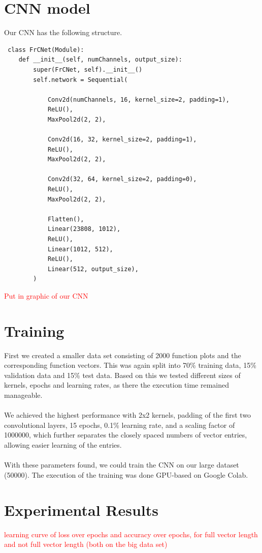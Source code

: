 \documentclass[11pt,a4paper]{scrartcl}
\begin{document}
\section{CNN model}
Our CNN has the following structure.
\begin{lstlisting}
 class FrCNet(Module):
    def __init__(self, numChannels, output_size):
        super(FrCNet, self).__init__()
        self.network = Sequential(

            Conv2d(numChannels, 16, kernel_size=2, padding=1),
            ReLU(),
            MaxPool2d(2, 2),

            Conv2d(16, 32, kernel_size=2, padding=1),
            ReLU(),
            MaxPool2d(2, 2),

            Conv2d(32, 64, kernel_size=2, padding=0),
            ReLU(),
            MaxPool2d(2, 2),

            Flatten(),
            Linear(23808, 1012),
            ReLU(),
            Linear(1012, 512),
            ReLU(),
            Linear(512, output_size),
        )
\end{lstlisting}
\textcolor{red}{Put in graphic of our CNN}

\section{Training}
First we created a smaller data set consisting of 2000 function plots and the corresponding function vectors. This was again split into 70\% training data, 15\% validation data and 15\% test data. Based on this we tested different sizes of kernels, epochs and learning rates, as there the execution time remained manageable.\\
\\
We achieved the highest performance with 2x2 kernels, padding of the first two convolutional layers, 15 epochs, 0.1\% learning rate, and a scaling factor of 1000000, which further separates the closely spaced numbers of vector entries, allowing easier learning of the entries.\\
 \\
With these parameters found, we could train the CNN on our large dataset (50000). The execution of the training was done GPU-based on Google Colab.
\section{Experimental Results}
\textcolor{red}{learning curve of loss over epochs and accuracy over epochs, for full vector length and not full vector length (both on the big data set)}
\end{document}
